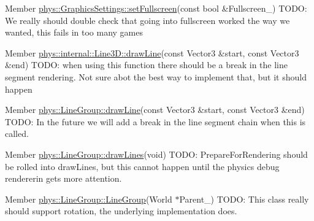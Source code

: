 \label{dd/da0/todo__todo000008}
\hypertarget{dd/da0/todo__todo000008}{}
 
\begin{DoxyDescription}
\item[Member \hyperlink{classphys_1_1GraphicsSettings_aba9e127ab2cf3f20604313e39d32f7a8}{phys::GraphicsSettings::setFullscreen}(const bool \&Fullscreen\_\-) ]TODO: We really should double check that going into fullscreen worked the way we wanted, this fails in too many games 
\end{DoxyDescription}

\label{dd/da0/todo__todo000009}
\hypertarget{dd/da0/todo__todo000009}{}
 
\begin{DoxyDescription}
\item[Member \hyperlink{classphys_1_1internal_1_1Line3D_a31bf19dc06547cbe042e1ddfbcf672f3}{phys::internal::Line3D::drawLine}(const Vector3 \&start, const Vector3 \&end) ]TODO: when using this function there should be a break in the line segment rendering. Not sure abot the best way to implement that, but it should happen 
\end{DoxyDescription}

\label{dd/da0/todo__todo000011}
\hypertarget{dd/da0/todo__todo000011}{}
 
\begin{DoxyDescription}
\item[Member \hyperlink{classphys_1_1LineGroup_a141db62ea17d94b9bce421e5df5a8d89}{phys::LineGroup::drawLine}(const Vector3 \&start, const Vector3 \&end) ]TODO: In the future we will add a break in the line segment chain when this is called. 
\end{DoxyDescription}

\label{dd/da0/todo__todo000012}
\hypertarget{dd/da0/todo__todo000012}{}
 
\begin{DoxyDescription}
\item[Member \hyperlink{classphys_1_1LineGroup_ade1bb4f8e1164e1b8d7aeabbc970b79d}{phys::LineGroup::drawLines}(void) ]TODO: PrepareForRendering should be rolled into drawLines, but this cannot happen until the physics debug rendererin gets more attention. 
\end{DoxyDescription}

\label{dd/da0/todo__todo000010}
\hypertarget{dd/da0/todo__todo000010}{}
 
\begin{DoxyDescription}
\item[Member \hyperlink{classphys_1_1LineGroup_a676039a6beec56d24c631e9da5fd7e76}{phys::LineGroup::LineGroup}(World $\ast$Parent\_\-) ]TODO: This class really should support rotation, the underlying implementation does. 
\end{DoxyDescription}

